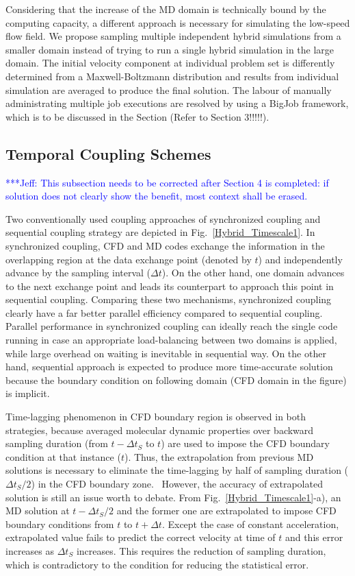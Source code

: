 \documentclass[preprint,12pt]{elsarticle}
\newcommand{\skonote}[1]{ {\textcolor{blue} { ***Jeff: #1 }}}
\newcommand{\skonote}[1]{}
\begin{document}
Considering that the increase of the MD domain is technically bound by the computing capacity, a different approach is necessary for simulating the low-speed flow field. We propose sampling multiple independent hybrid simulations from a smaller domain instead of trying to run a single hybrid simulation in the large domain.
The initial velocity component at individual problem set is differently determined from a Maxwell-Boltzmann distribution and results from individual simulation are averaged to produce the final solution. The labour of manually administrating multiple job executions are resolved by using a BigJob framework, which is to be discussed in the Section (Refer to Section 3!!!!!).


\subsection{Temporal Coupling Schemes}


\skonote{This subsection needs to be corrected after Section 4 is completed: if solution does not clearly show the benefit, most context shall be erased.}

Two conventionally used coupling approaches of synchronized coupling and sequential coupling strategy are depicted in Fig.~\ref{Hybrid_Timescale1}. In synchronized coupling, CFD and MD codes exchange the information in the overlapping region at the data exchange point (denoted by $t$) and independently advance by the sampling interval (${\Delta}t$). On the other hand, one domain advances to the next exchange point and leads its counterpart to approach this point in sequential coupling. Comparing these two mechanisms, synchronized coupling clearly have a far better parallel efficiency compared to sequential coupling.~\cite{Time_Mechanism} Parallel performance in synchronized coupling can ideally reach the single code running in case an appropriate load-balancing between two domains is applied, while large overhead on waiting is inevitable in sequential way. On the other hand, sequential approach is expected to produce more time-accurate solution because the boundary condition on following domain (CFD domain in the figure) is implicit. 

Time-lagging phenomenon in CFD boundary region is observed in both strategies, because averaged molecular dynamic properties over backward sampling duration (from $t-{\Delta}t_S$ to $t$) are used to impose the CFD boundary condition at that instance ($t$). Thus,  the extrapolation from previous MD solutions is necessary to eliminate the time-lagging by half of sampling duration (${\Delta}t_{S}/{2}$) in the CFD boundary zone.~\cite{Wang} However, the accuracy of extrapolated solution is still an issue worth to debate. From Fig.~\ref{Hybrid_Timescale1}-a), an MD solution at $t-{\Delta}t_{S}/{2}$ and the former one are extrapolated to impose CFD boundary conditions from $t$ to $t+\Delta{t}$. Except the case of constant acceleration, extrapolated value fails to predict the correct velocity at time of $t$ and this error increases as $\Delta{t}_S$ increases. This requires the reduction of sampling duration, which is contradictory to the condition for reducing the statistical error.
\end{document}
